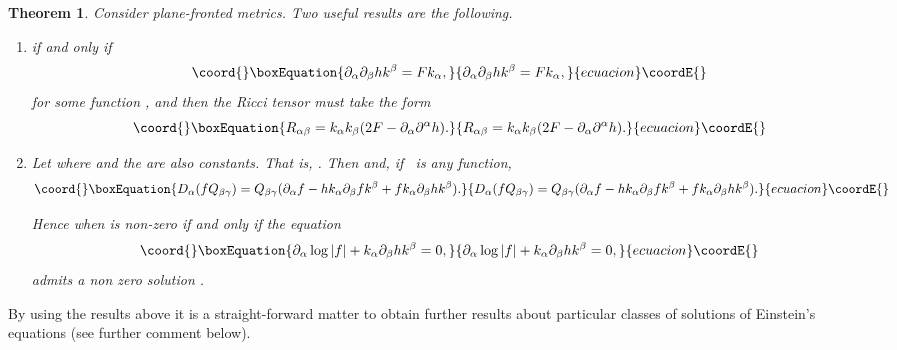 \documentclass[12pt,a4paper]{article}
\newcounter{theorem}
\newtheorem{theorem}{Theorem}[section]   %
\newcounter{eg}
\def\p{\partial}
\begin{document}
\begin{theorem}

Consider {\em plane-fronted} metrics. Two useful results are the following.

\begin{enumerate}

\item {}\coordHE{} if and only if%
\begin{equation}\coord{}\boxEquation{
\p_{\alpha}\p_{\beta} h k^{\beta} = Fk_{\alpha},
}{
\p_{\alpha}\p_{\beta} h k^{\beta} = Fk_{\alpha},
}{ecuacion}\coordE{}\end{equation}
for some function \coordHE{}, and then the Ricci tensor must take the form%
\begin{equation}\coord{}\boxEquation{
 R_{\alpha\beta} = k_{\alpha}k_{\beta}(2F-\p_\alpha \p^{\alpha} h).
}{
 R_{\alpha\beta} = k_{\alpha}k_{\beta}(2F-\p_\alpha \p^{\alpha} h).
}{ecuacion}\coordE{}\end{equation}

\item  Let \coordHE{} 
where \coordHE{} and the \coordHE{}
are also constants. That is, \myHighlight{$\p_{\beta} q_{\alpha} = 0$}\coordHE{}. 
Then \coordHE{} and, if \coordHE{}\ is any function,
\begin{equation}\coord{}\boxEquation{
D_\alpha (fQ_{\beta\gamma}) = Q_{\beta\gamma}(\p_{\alpha}f - 
hk_{\alpha} \p_{\beta}f k^{\beta} +
fk_{\alpha}\p_\beta h k^{\beta}).
}{
D_\alpha (fQ_{\beta\gamma}) = Q_{\beta\gamma}(\p_{\alpha}f - 
hk_{\alpha} \p_{\beta}f k^{\beta} +
fk_{\alpha}\p_\beta h k^{\beta}).
}{ecuacion}\coordE{}\end{equation}

Hence when \coordHE{} is non-zero \coordHE{} if
and only if the equation%
\begin{equation}\coord{}\boxEquation{
\p_\alpha \log |f| + k_{\alpha}\p_\beta h k^{\beta}=0,
}{
\p_\alpha \log |f| + k_{\alpha}\p_\beta h k^{\beta}=0,
}{ecuacion}\coordE{}\end{equation}
admits a non zero solution \coordHE{}.
\end{enumerate}

\end{theorem}
By using the results above it is a straight-forward matter to obtain further
results about particular classes of solutions of Einstein's equations (see
further comment below).
\end{document}
